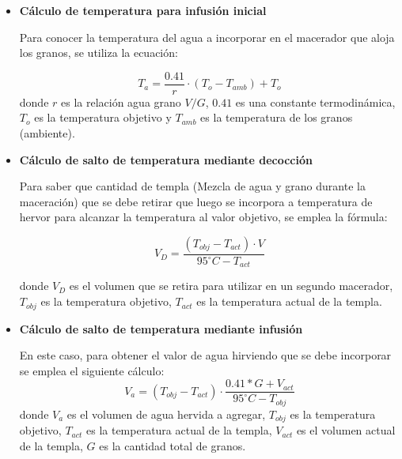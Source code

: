             \begin{itemize}
                \item \textbf{Cálculo de temperatura para infusión inicial}
                \par Para conocer la temperatura del agua a incorporar en el macerador que aloja los granos, se utiliza la ecuación:
                
                \begin{equation}
                    T_a = \frac{0.41}{r} \cdot (T_o - T_{amb}) + T_o
                \end{equation}
                donde $r$ es la relación agua grano $V/G$, $0.41$ es una constante termodinámica, $T_o$ es la temperatura objetivo y $T_{amb}$ es la temperatura de los granos (ambiente). 
                
                \item \textbf{Cálculo de salto de temperatura mediante decocción}
                \par Para saber que cantidad de templa (Mezcla de agua y grano durante la maceración) que se debe retirar que luego se incorpora a temperatura de hervor para alcanzar la temperatura al valor objetivo, se emplea la fórmula:
                
                \begin{equation}
                    V_D = \frac{(T_{obj} - T_{act}) \cdot V }{95^{\circ}C - T_{act}}
                \end{equation}
                
                \par donde $V_D$ es el volumen que se retira para utilizar en un segundo macerador, $T_{obj}$ es la temperatura objetivo, $T_{act}$ es la temperatura actual de la templa. 
                
                \item \textbf{Cálculo de salto de temperatura mediante infusión}
                \par En este caso, para obtener el valor de agua hirviendo que se debe incorporar se emplea el siguiente cálculo:
                \begin{equation}
                    V_a = (T_{obj} - T_{act}) \cdot \frac{0.41 * G + V_{act}}{95^{\circ}C - T_{obj}}
                \label{EcuacionEscalon}
                \end{equation}
                donde $V_a$ es el volumen de agua hervida a agregar, $T_{obj}$ es la temperatura objetivo, $T_{act}$ es la temperatura actual de la templa, $V_{act}$ es el volumen actual de la templa, $G$ es la cantidad total de granos.
                

\end{itemize}

